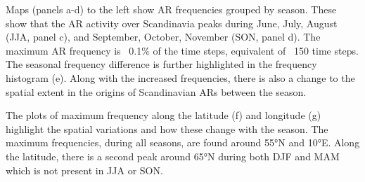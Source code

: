 \documentclass{article}
\begin{document}
\begin{minipage}{397.4mm}
	\begin{minipage}[t]{192.67mm}

		\fontsize{30}{36}\selectfont
		Maps (panels a-d) to the left show AR frequencies grouped by season. These show that the AR activity over Scandinavia peaks during June, July, August (JJA, panel c), and September, October, November (SON, panel d). The maximum AR frequency is ~0.1\% of the time steps, equivalent of ~150 time steps. The seasonal frequency difference is further highlighted in the frequency histogram (e). Along with the increased frequencies, there is also a change to the spatial extent in the origins of Scandinavian ARs between the season.
	\end{minipage}%
	\hfill
	\begin{minipage}[t]{192.67mm}
		\fontsize{30}{36}\selectfont
		The plots of maximum frequency along the latitude (f) and longitude (g) highlight the spatial variations and how these change with the season.  The maximum frequencies, during all seasons, are found around 55°N and 10°E. Along the latitude, there is a second peak around 65°N during both DJF and MAM which is not present in JJA or SON.
	\end{minipage}
\end{minipage}
\end{document}

